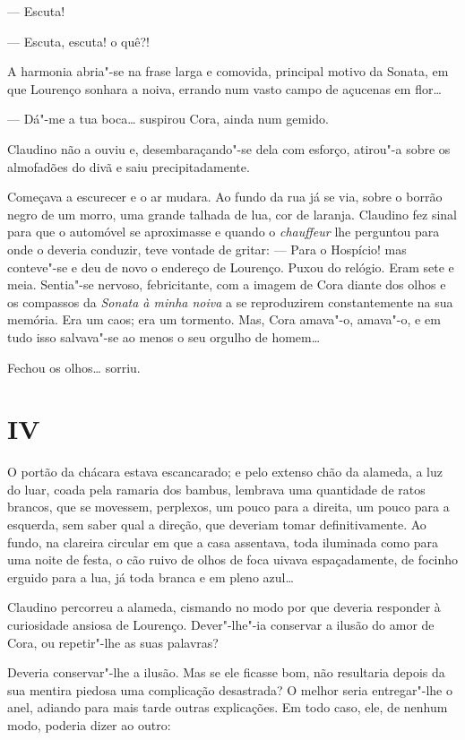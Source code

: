 --- Escuta!

--- Escuta, escuta! o quê?!

A harmonia abria"-se na frase larga e comovida, principal motivo da
Sonata, em que Lourenço sonhara a noiva, errando num vasto campo de
açucenas em flor\ldots{}

--- Dá"-me a tua boca\ldots{} suspirou Cora, ainda num gemido.

Claudino não a ouviu e, desembaraçando"-se dela com esforço, atirou"-a
sobre os almofadões do divã e saiu precipitadamente.

Começava a escurecer e o ar mudara. Ao fundo da rua já se via, sobre o
borrão negro de um morro, uma grande talhada de lua, cor de laranja.
Claudino fez sinal para que o automóvel se aproximasse e quando o
\emph{chauffeur} lhe perguntou para onde o deveria conduzir, teve
vontade de gritar: --- Para o Hospício! mas conteve"-se e deu de novo o
endereço de Lourenço. Puxou do relógio. Eram sete e meia. Sentia"-se
nervoso, febricitante, com a imagem de Cora diante dos olhos e os
compassos da \emph{Sonata à minha noiva} a se reproduzirem
constantemente na sua memória. Era um caos; era um tormento. Mas, Cora
amava"-o, amava"-o, e em tudo isso salvava"-se ao menos o seu orgulho de
homem\ldots{}

Fechou os olhos\ldots{} sorriu.

\section{IV}

O portão da chácara estava escancarado; e pelo extenso chão da alameda,
a luz do luar, coada pela ramaria dos bambus, lembrava uma quantidade de
ratos brancos, que se movessem, perplexos, um pouco para a direita, um
pouco para a esquerda, sem saber qual a direção, que deveriam tomar
definitivamente. Ao fundo, na clareira circular em que a casa assentava,
toda iluminada como para uma noite de festa, o cão ruivo de olhos de
foca uivava espaçadamente, de focinho erguido para a lua, já toda branca
e em pleno azul\ldots{}

Claudino percorreu a alameda, cismando no modo por que deveria responder
à curiosidade ansiosa de Lourenço. Dever"-lhe"-ia conservar a ilusão do
amor de Cora, ou repetir"-lhe as suas palavras?

Deveria conservar"-lhe a ilusão. Mas se ele ficasse bom, não resultaria
depois da sua mentira piedosa uma complicação desastrada? O melhor seria
entregar"-lhe o anel, adiando para mais tarde outras explicações. Em todo
caso, ele, de nenhum modo, poderia dizer ao outro:

